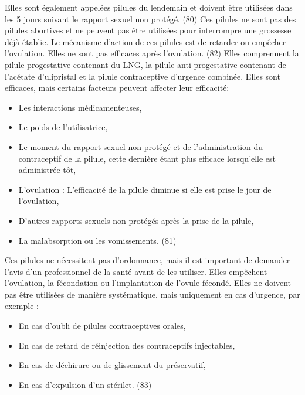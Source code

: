Elles sont également appelées pilules du lendemain et doivent être utilisées dans les 5 jours suivant le rapport sexuel non protégé. (80) Ces pilules ne sont pas des pilules abortives et ne peuvent pas être utilisées pour interrompre une grossesse déjà établie. Le mécanisme d’action de ces pilules est de retarder ou empêcher l’ovulation. Elles ne sont pas efficaces après l’ovulation. (82) Elles comprennent la pilule progestative contenant du LNG, la pilule anti progestative contenant de l’acétate d’ulipristal et la pilule contraceptive d’urgence combinée. Elles sont efficaces, mais certains facteurs peuvent affecter leur efficacité: 

\begin{itemize}
  \item	Les interactions médicamenteuses,
  \item	Le poids de l’utilisatrice,
  \item Le moment du rapport sexuel non protégé et de l’administration du contraceptif de la pilule, cette dernière étant plus efficace lorsqu’elle est administrée tôt,
  \item	L’ovulation : L’efficacité de la pilule diminue si elle est prise le jour de l’ovulation,
  \item	D’autres rapports sexuels non protégés après la prise de la pilule,  
  \item La malabsorption ou les vomissements. (81) 
\end{itemize}

\noindent Ces pilules ne nécessitent pas d’ordonnance, mais il est important de demander l’avis d’un professionnel de la santé avant de les utiliser. Elles empêchent l’ovulation, la fécondation ou l’implantation de l’ovule fécondé. Elles ne doivent pas être utilisées de manière systématique, mais uniquement en cas d’urgence, par exemple : 

\begin{itemize}
  \item En cas d’oubli de pilules contraceptives orales, 
  \item En cas de retard de réinjection des contraceptifs injectables, 
  \item En cas de déchirure ou de glissement du préservatif,
  \item En cas d’expulsion d’un stérilet. (83)
\end{itemize}

\vspace*{1em}

